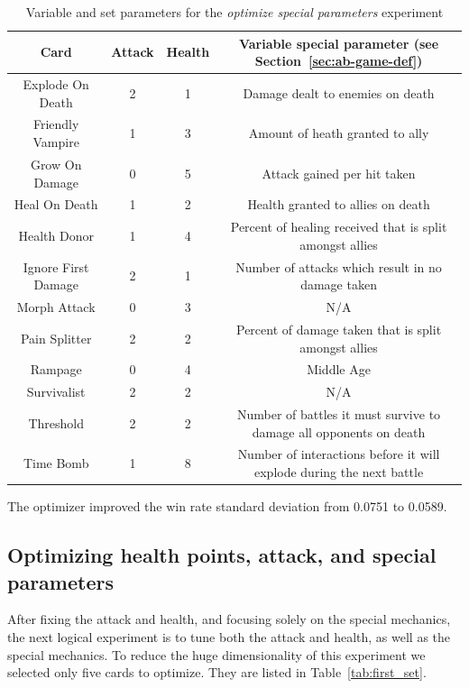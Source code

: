 \begin{table}[t]
\centering
\begin{tabular}{||c c c c||} 
 \hline
 Card & Attack & Health & Variable special parameter (see Section~\ref{sec:ab-game-def})\\ [0.5ex] 
 \hline\hline
 Explode On Death & 2 & 1 & Damage dealt to enemies on death \\ 
 \hline
 Friendly Vampire & 1 & 3 & Amount of heath granted to ally \\
 \hline
 Grow On Damage & 0 & 5 & Attack gained per hit taken \\
 \hline
 Heal On Death & 1 & 2 & Health granted to allies on death \\
 \hline
 Health Donor & 1 & 4 & Percent of healing received that is split amongst allies \\
 \hline
 Ignore First Damage & 2 & 1 & Number of attacks which result in no damage taken \\
 \hline
 Morph Attack & 0 & 3 & N/A \\
 \hline
 Pain Splitter & 2 & 2 & Percent of damage taken that is split amongst allies \\
 \hline
 Rampage & 0 & 4 & Middle Age  \\
 \hline
 Survivalist & 2 & 2 & N/A \\
 \hline
 Threshold & 2 & 2 & Number of battles it must survive to damage all opponents on death \\
 \hline
 Time Bomb & 1 & 8 & Number of interactions before it will explode during the next battle \\ 
 \hline
\end{tabular}
\caption{Variable and set parameters for the \textit{optimize special parameters} experiment}
\label{tab:special_cards}
\end{table}

The optimizer improved the win rate standard deviation from 0.0751 to 0.0589. 

\subsection{Optimizing health points, attack, and special parameters} \label{sec:first_set}

After fixing the attack and health, and focusing solely on the special mechanics, the next logical experiment is to tune both the attack and health, as well as the special mechanics. To reduce the huge dimensionality of this experiment we selected only five cards to optimize. They are listed in Table~\ref{tab:first_set}.

